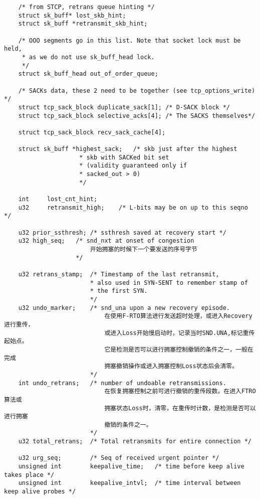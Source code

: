 \begin{verbatim}
    /* from STCP, retrans queue hinting */
    struct sk_buff* lost_skb_hint;
    struct sk_buff *retransmit_skb_hint;

    /* OOO segments go in this list. Note that socket lock must be held,
     * as we do not use sk_buff_head lock.
     */
    struct sk_buff_head out_of_order_queue;

    /* SACKs data, these 2 need to be together (see tcp_options_write) */
    struct tcp_sack_block duplicate_sack[1]; /* D-SACK block */
    struct tcp_sack_block selective_acks[4]; /* The SACKS themselves*/

    struct tcp_sack_block recv_sack_cache[4];

    struct sk_buff *highest_sack;   /* skb just after the highest
                     * skb with SACKed bit set
                     * (validity guaranteed only if
                     * sacked_out > 0)
                     */

    int     lost_cnt_hint;
    u32     retransmit_high;    /* L-bits may be on up to this seqno */

    u32 prior_ssthresh; /* ssthresh saved at recovery start */
    u32 high_seq;   /* snd_nxt at onset of congestion   
                        开始拥塞的时候下一个要发送的序号字节                    
                    */

    u32 retrans_stamp;  /* Timestamp of the last retransmit,
                        * also used in SYN-SENT to remember stamp of
                        * the first SYN. 
                        */
    u32 undo_marker;    /* snd_una upon a new recovery episode. 
                            在使用F-RTO算法进行发送超时处理，或进入Recovery进行重传，
                            或进入Loss开始慢启动时，记录当时SND.UNA,标记重传起始点。
                            它是检测是否可以进行拥塞控制撤销的条件之一，一般在完成
                            拥塞撤销操作或进入拥塞控制Loss状态后会清零。
                        */
    int undo_retrans;   /* number of undoable retransmissions. 
                            在恢复拥塞控制之前可进行撤销的重传段数。在进入FTRO算法或
                            拥塞状态Loss时，清零，在重传时计数，是检测是否可以进行拥塞
                            撤销的条件之一。
                        */
    u32 total_retrans;  /* Total retransmits for entire connection */

    u32 urg_seq;        /* Seq of received urgent pointer */
    unsigned int        keepalive_time;   /* time before keep alive takes place */
    unsigned int        keepalive_intvl;  /* time interval between keep alive probes */


\end{verbatim}
